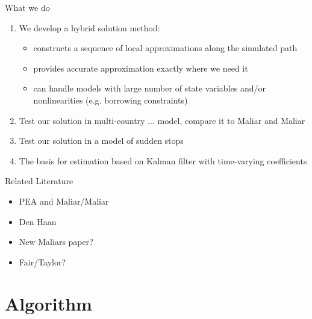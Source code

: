 \documentclass{beamer}
\begin{document}
\begin{frame}{What we do}

    \begin{enumerate}
        \item We develop a hybrid solution method:

            \begin{itemize}
                \item constructs a sequence of local approximations along the simulated path
                \item provides accurate approximation exactly where we need it
                \item can handle models with large number of state variables
                    and/or nonlinearities (e.g. borrowing constraints)
            \end{itemize}
        \item Test our solution in multi-country ... model, compare 
            it to Maliar and Maliar
        \item Test our solution in a model of sudden stops
        \item The basis for estimation based on Kalman filter with
            time-varying coefficients
    \end{enumerate}
        
\end{frame}

\begin{frame}{Related Literature}

\begin{itemize}
    \item PEA and Maliar/Maliar
    \item Den Haan
    \item New Maliars paper?
    \item Fair/Taylor? 
\end{itemize}

\end{frame}

\section{Algorithm}
\end{document}
